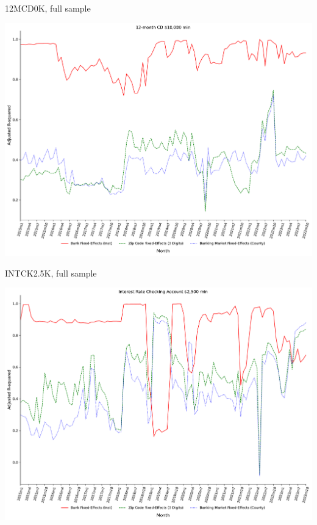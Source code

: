 \documentclass{beamer}
\begin{document}
\begin{frame}{12MCD0K, full sample}
\begin{center}
\includegraphics[width=1\textwidth]{figure/all_sample_939605/3_fixed_effects_same_as_GP_wp/12MCD10K_adjusted_R2_Rate_3_fixed_effects.pdf} 
\end{center}
\end{frame}


\begin{frame}{INTCK2.5K, full sample}
\begin{center}
\includegraphics[width=1\textwidth]{figure/all_sample_939605/3_fixed_effects_same_as_GP_wp/INTCK2_5K_adjusted_R2_Rate_3_fixed_effects.pdf} 
\end{center}
\end{frame}
\end{document}
